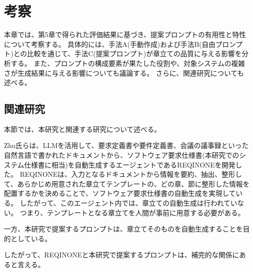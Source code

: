 \chapter{考察}\label{cha:Discussion}

本章では、第5章で得られた評価結果に基づき、提案プロンプトの有用性と特性について考察する。
具体的には、手法A(手動作成)および手法B(自由プロンプト)との比較を通じて、手法C(提案プロンプト)が章立ての品質に与える影響を分析する。
また、プロンプトの構成要素が果たした役割や、対象システムの複雑さが生成結果に与える影響についても議論する。
さらに、関連研究についても述べる。

\section{関連研究}

本節では、本研究と関連する研究について述べる。

Zhu氏らは、LLMを活用して、要求定義書や要件定義書、会議の議事録といった自然言語で書かれたドキュメントから、ソフトウェア要求仕様書(本研究でのシステム仕様書に相当)を自動生成するエージェントであるREQINONEを開発した\cite{reference}。
REQINONEは、入力となるドキュメントから情報を要約、抽出、整形して、あらかじめ用意された章立てテンプレートの、どの章、節に整形した情報を配置するかを決めることで、ソフトウェア要求仕様書の自動生成を実現している。
したがって、このエージェント内では、章立ての自動生成は行われていない。
つまり、テンプレートとなる章立てを人間が事前に用意する必要がある。

一方、本研究で提案するプロンプトは、章立てそのものを自動生成することを目的としている。

したがって、REQINONEと本研究で提案するプロンプトは、補完的な関係にあると言える。


